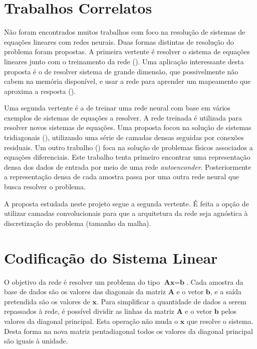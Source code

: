 \documentclass[final,5p]{elsarticle}
\numberwithin{equation}{section}
\begin{document}
\section{Trabalhos Correlatos}

    Não foram encontrados muitos trabalhos com foco na resolução de sistemas de equações lineares com redes neurais. Duas formas distintas de resolução do problema foram propostas. A primeira vertente é resolver o sistema de equações lineares junto com o treinamento da rede (\cite{cichocki1992neural}). Uma aplicação interessante desta proposta é o de resolver sistema de grande dimensão, que possivelmente não cabem na memória disponível, e usar a rede para aprender um mapeamento que aproxima a resposta (\cite{gu2023deep}).

    Uma segunda vertente é a de treinar uma rede neural com base em vários exemplos de sistemas de equações a resolver. A rede treinada é utilizada para resolver novos sistemas de equações. Uma proposta focou na solução de sistemas tridiagonais (\cite{jiang2023neural}), utilizando uma série de camadas densas seguidas por conexões residuais. Um outro trabalho (\cite{kontolati2024learning}) foca na solução de problemas físicos associados a equações diferenciais. Este trabalho tenta primeiro encontrar uma representação densa dos dados de entrada por meio de uma rede \emph{autoenconder}. Posteriormente a representação densa de cada amostra passa por uma outra rede neural que busca resolver o problema.

    A proposta estudada neste projeto segue a segunda vertente. É feita a opção de utilizar camadas convolucionais para que a arquitetura da rede seja agnóstica à discretização do problema (tamanho da malha).

\section{Codificação do Sistema Linear}

    O objetivo da rede é resolver um problema do tipo $\textbf{Ax}=\textbf{b}$. Cada amostra da base de dados são os valores das diagonais da matriz $\textbf{A}$ e o vetor $\textbf{b}$, e a saída pretendida são os valores de $\textbf{x}$. Para simplificar a quantidade de dados a serem repassados à rede, é possível dividir as linhas da matriz $\textbf{A}$ e o vetor $\textbf{b}$ pelos valores da diagonal principal. Esta operação não muda o $\textbf{x}$ que resolve o sistema. Desta forma na nova matriz pentadiagonal todos os valores da diagonal principal são iguais à unidade.
\end{document}
